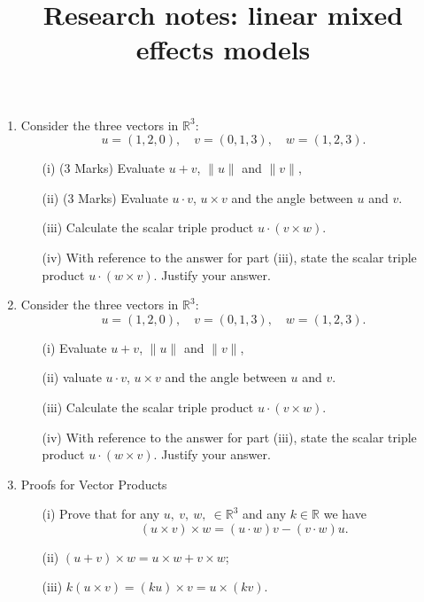 \documentclass[12pt, a4paper]{report}
\title{Research notes: linear mixed effects models}
\author{ } \date{ }
\theoremstyle{plain}
\theoremstyle{definition}
\theoremstyle{remark}
\begin{document}
\begin{enumerate}
\item 
Consider the three vectors in $\mathbb{R}^3$:
$$
u = (1, 2, 0), \quad v = (0, 1, 3),\quad w = (1, 2, 3).
$$
\begin{itemize}
\item[(i)] (3 Marks) Evaluate $u+v$, $\|u\|$ and $\|v\|$,
\smallskip \item[(ii)] (3 Marks) Evaluate $u\cdot v$, $u\times v$ and the angle between $u$ and $v$. %

\smallskip\item[(iii)] Calculate the scalar triple product  $u\cdot(v \times w)$.%
\smallskip\item[(iv)]  With reference to the answer for part (iii), state the scalar triple product  $u\cdot(w \times v)$. Justify your answer. %
\end{itemize}
\smallskip

\item Consider the three vectors in $\mathbb{R}^3$:
$$
u = (1, 2, 0), \quad v = (0, 1, 3),\quad w = (1, 2, 3).
$$
\begin{itemize}
\item[(i)] Evaluate $u+v$, $\|u\|$ and $\|v\|$,
\smallskip \item[(ii)] 
valuate $u\cdot v$, $u\times v$ and the angle between $u$ and $v$. %

\smallskip\item[(iii)]  Calculate the scalar triple product  $u\cdot(v \times w)$.%
\smallskip\item[(iv)]  With reference to the answer for part (iii), state the scalar triple product  $u\cdot(w \times v)$. Justify your answer. %
\end{itemize}

\item Proofs for Vector Products

\begin{itemize}
\item[(i)] Prove that for any $u,\:v,\:w,\:\in\mathbb{R}^3$
and any $k\in\mathbb{R}$ we have \[(u\times v)\times w= (u\cdot w)v - (v\cdot w)u.\]

\item[(ii)]  $(u+v)\times w=u\times w + v\times w$;

\item[(iii)] $k(u\times v)=(ku)\times v = u\times (kv)$.
\end{itemize} \
\end{enumerate}
\end{document}

